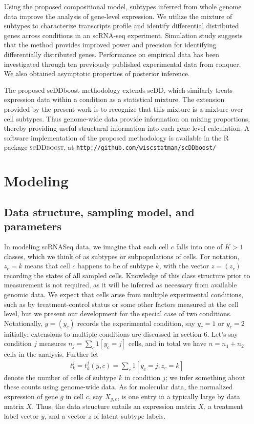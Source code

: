 \documentclass[11pt]{amsart}
\begin{document}
 
Using the proposed compositional model, subtypes inferred from whole genome data 
improve the analysis of gene-level expression.  We utilize the mixture of subtypes to 
characterize transcripts profile and identify differential distributed genes across conditions in an scRNA-seq experiment.
Simulation study suggests that the method provides improved power and precision for identifying differentially distributed genes. 
Performance on empirical data has been investigated through ten previously published experimental data from conquer\cite{ref:Cq}. 
We also obtained asymptotic properties of posterior inference. 

The proposed scDDboost methodology extends scDD\cite{ref:scDD}, which similarly treats expression data within a condition as a statistical mixture.   
The extension provided by the present work is to recognize that this mixture is a mixture over cell subtypes.  
Thus genome-wide data provide information on mixing proportions, thereby providing useful
structural information into each gene-level calculation.   A software implementation of the proposed methodology 
is available in the R package \textsc{scDDboost}, at \verb+http://github.com/wiscstatman/scDDboost/+

\section{Modeling}
\subsection{Data structure, sampling model, and parameters}

In modeling scRNASeq data, we
imagine that each cell $c$ falls into one of $K>1$ classes, which we think of as
subtypes or subpopulations of cells. For notation, $z_c=k$ means that cell $c$ happens to be of subtype $k$, with the vector $z=(z_c)$ recording
the states of all sampled cells.  Knowledge of this class structure
 prior to measurement is not required, as it will be inferred as necessary from
 available genomic data.   We expect that cells arise from multiple
experimental conditions, such as by treatment-control status or some other factors
 measured at the cell level, but we present our development for the special
case of two conditions.  Notationally, $y=(y_c)$ records the experimental condition, say $y_c=1$ or $y_c=2$ initially:
extensions to multiple conditions are discussed in section 6. Let's say condition $j$ measures $n_j=\sum_{c} 1[y_c=j]$ cells,  and
in total we have $n=n_1+n_2$ cells in the analysis.  Further let 
\begin{eqnarray}
\label{eq:counts}
t^j_k = t^j_k(y,c) = \sum_c 1[y_c=j, z_c=k] 
\end{eqnarray}
denote the number of cells of subtype $k$ in condition $j$;
we infer something about these counts using genome-wide data.  As for molecular data, the 
normalized expression of gene $g$ in cell $c$, say $X_{g,c}$, is one entry
in a typically large {} by {} data matrix $X$.  Thus, the data structure entails an expression matrix
$X$, a treatment label vector $y$, and a vector $z$ of latent subtype labels.
\end{document}

